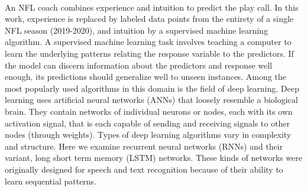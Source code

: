 \documentclass{article}
\begin{document}
\begin{multicols*}{2}
        \paragraph{}
            An NFL coach combines experience and intuition to predict the play call. 
            In this work, experience is replaced by labeled data points from the entirety of a single NFL season (2019-2020), and intuition by a supervised machine learning algorithm. 
            A supervised machine learning task involves teaching a computer to learn the underlying patterns relating the response variable to the predictors. 
            If the model can discern information about the predictors and response well enough, its predictions should generalize well to unseen instances. 
            Among the most popularly used algorithms in this domain is the field of deep learning. 
            Deep learning uses artificial neural networks (ANNs) that loosely resemble a biological brain. 
            They contain networks of individual neurons or nodes, each with its own activation signal, that is each capable of sending and receiving signals to other nodes (through weights). 
            Types of deep learning algorithms vary in complexity and structure. 
            Here we examine recurrent neural networks (RNNs) and their variant, long short term memory (LSTM) networks. 
            These kinds of networks were originally designed for speech and text recognition because of their ability to learn sequential patterns. 

    

    \end{multicols*}
\end{document}
